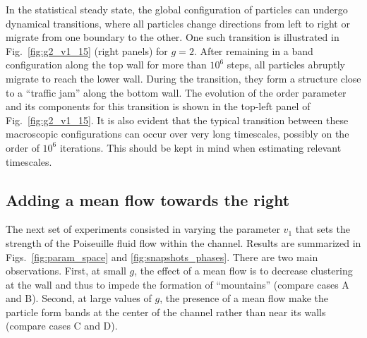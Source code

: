 \documentclass[aps,prl,twocolumn,amsmath,amssymb,superscriptaddress]{revtex4-1}
\begin{document}
In the statistical steady state, the global configuration of particles can undergo dynamical transitions, where all particles change directions from left to right or migrate from one boundary to the other. One such transition is illustrated in Fig.~\ref{fig:g2_v1_15} (right panels) for $g=2$. After remaining in a band configuration along the top wall for more than $10^6$ steps, all particles abruptly migrate to reach the lower wall. During the transition, they form a structure close to a ``traffic jam'' along the bottom wall. The evolution of the order parameter and its components for this transition is shown in the top-left panel of Fig.~\ref{fig:g2_v1_15}. It is also evident that the typical transition between these macroscopic configurations can occur over very long timescales, possibly on the order of $10^6$ iterations. This should be kept in mind when estimating relevant timescales.

\subsection{Adding a mean flow towards the right}
The next set of experiments consisted in varying the parameter $v_1$ that sets the strength of the Poiseuille fluid flow within the channel. Results are summarized in Figs.~\ref{fig:param_space} and \ref{fig:snapshots_phases}. There are two main observations. First, at small $g$, the effect of a mean flow is to decrease clustering at the wall and thus to impede the formation of ``mountains'' (compare cases A and B). Second, at large values of $g$, the presence of a mean flow make the particle form bands at the center of the channel rather than near its walls (compare cases C and D).
\end{document}
